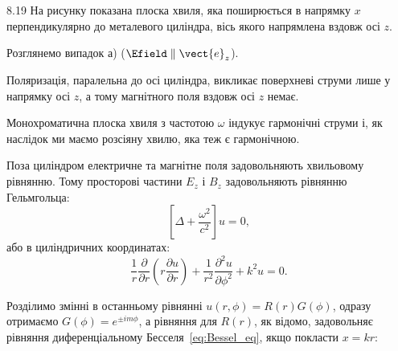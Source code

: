 \begin{Solution}{8.{19}}
	На рисунку показана плоска хвиля, яка поширюється в напрямку $x$ перпендикулярно до металевого
	циліндра, вісь якого напрямлена вздовж осі $z$.

	\begin{center}
	\end{center}

	Розглянемо випадок а) ($\Efield \parallel \vect{e}_z$).

	Поляризація, паралельна до осі циліндра, викликає поверхневі струми лише у напрямку осі $z$, а
	тому магнітного поля вздовж осі $z$ немає.

	Монохроматична плоска хвиля з частотою $\omega$ індукує  гармонічні струми і, як наслідок ми маємо
	розсіяну хвилю, яка теж є гармонічною.

	Поза циліндром електричне та магнітне поля задовольняють хвильовому рівнянню.
	Тому просторові частини $E_z$ і $B_z$ задовольняють рівнянню Гельмгольца:
	\[
		\left[ \Delta + \frac{\omega^2}{c^2}\right] u = 0,
	\]
	або в циліндричних координатах:
	\[
		\frac1r \frac{\partial }{\partial r}
		\left( r \frac{\partial u}{\partial r} \right) + \frac{1}{r^2} \frac{\partial^2 u}{\partial
		\phi^2} + k^2 u = 0.
	\]

	Розділимо змінні в останньому рівнянні $u(r,\phi) = R(r)G(\phi)$, одразу отримаємо $G(\phi) =
	e^{\pm im\phi}$, а рівняння для $R(r)$, як відомо, задовольняє рівняння диференціальному
	Бесселя~\eqref{eq:Bessel_eq}, якщо покласти $x = kr$:


\end{Solution}
